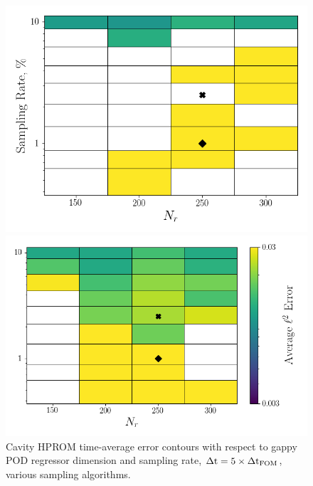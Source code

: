\begin{figure}
	\begin{minipage}{0.46\linewidth}
		\includegraphics[width=0.99\linewidth]{Chapters/HPROMResults/Images/cavity/deim/err_contour_gnat1_dt5e-6.png}
	\end{minipage}
	\begin{minipage}{0.53\linewidth}
		\includegraphics[width=0.99\linewidth]{Chapters/HPROMResults/Images/cavity/deim/err_contour_gnat2_dt5e-6.png}
	\end{minipage}
	\caption{\label{fig:cavitySampledROMErrContour}Cavity HPROM time-average error contours with respect to gappy POD regressor dimension and sampling rate, $\Delta \text{t} = 5 \times \Delta \text{t}_{\text{FOM}}$, various sampling algorithms.}
\end{figure}

